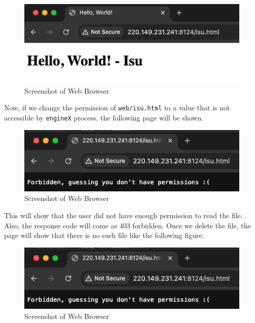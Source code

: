 \documentclass{homework}
\begin{document}
\begin{figure}[h]
\begin{center}
\includegraphics[scale=0.6]{5_ss2.png}    
\caption{Screenshot of Web Browser}
\end{center}
\end{figure}

Now, if we change the permission of \texttt{web/isu.html} to a value that is not accessible by \texttt{engineX} process, the following page will be shown.

\begin{figure}[h]
\begin{center}
\includegraphics[scale=0.6]{6_ss3.png}    
\caption{Screenshot of Web Browser}
\end{center}
\end{figure}

This will show that the user did not have enough permission to read the file. Also, the response code will come as 403 forbidden. Once we delete the file, the page will show that there is no such file like the following figure.

\begin{figure}[h]
\begin{center}
\includegraphics[scale=0.6]{6_ss3.png}    
\caption{Screenshot of Web Browser}
\end{center}
\end{figure}
\end{document}
